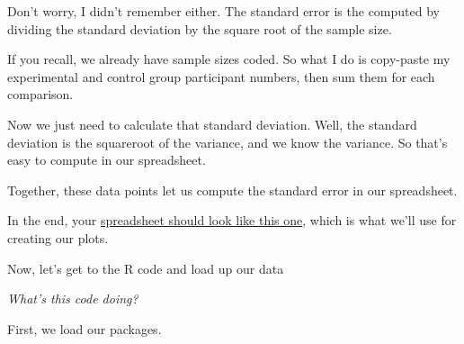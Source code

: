 \documentclass[
]{book}
\newenvironment{Shaded}{\begin{snugshade}}{\end{snugshade}}
\newcommand{\CommentTok}[1]{\textcolor[rgb]{0.56,0.35,0.01}{\textit{#1}}}
\newcommand{\FunctionTok}[1]{\textcolor[rgb]{0.13,0.29,0.53}{\textbf{#1}}}
\newcommand{\NormalTok}[1]{#1}
\newcommand{\OtherTok}[1]{\textcolor[rgb]{0.56,0.35,0.01}{#1}}
\newcommand{\SpecialCharTok}[1]{\textcolor[rgb]{0.81,0.36,0.00}{\textbf{#1}}}
\newcommand{\StringTok}[1]{\textcolor[rgb]{0.31,0.60,0.02}{#1}}
\begin{document}
Don't worry, I didn't remember either. The standard error is the computed by dividing the standard deviation by the square root of the sample size.

If you recall, we already have sample sizes coded. So what I do is copy-paste my experimental and control group participant numbers, then sum them for each comparison.

Now we just need to calculate that standard deviation. Well, the standard deviation is the squareroot of the variance, and we know the variance. So that's easy to compute in our spreadsheet.

Together, these data points let us compute the standard error in our spreadsheet.

In the end, your \href{https://github.com/noah-schroeder/reviewbook/blob/abfdb439ef81267b388ef75067a03262e1e59020/data\%20for\%20plots.csv}{spreadsheet should look like this one}, which is what we'll use for creating our plots.

Now, let's get to the R code and load up our data

\begin{Shaded}
\end{Shaded}

\emph{What's this code doing?}

First, we load our packages.
\end{document}
